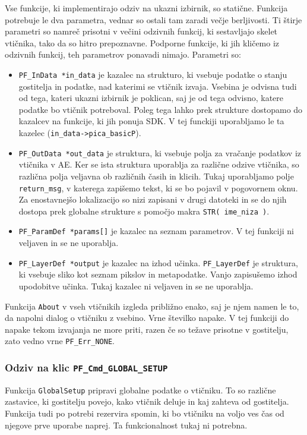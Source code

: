 \documentclass[a4paper, 12pt]{book}
\begin{document}
Vse funkcije, ki implementirajo odziv na ukazni izbirnik, so statične.
Funkcija potrebuje le dva parametra, vednar so ostali tam zaradi večje ber\-ljivosti\cite{aesdk}.	
Ti štirje parametri so namreč prisotni v večini odzivnih funkcij, ki sestavljajo skelet vtičnika, tako da so hitro prepoznavne. 
Podporne funkcije, ki jih kličemo iz odzivnih funkcij, teh parametrov ponavadi nimajo.
Parametri so:
\begin{itemize}
\item{\texttt{PF\_InData *in\_data} je kazalec na strukturo, ki vsebuje podatke o stanju gostitelja in podatke, nad katerimi se vtičnik izvaja. 
	Vsebina je odvisna tudi od tega, kateri ukazni izbirnik je poklican, saj je od tega odvisno, katere podatke bo vtičnik potreboval. 
	Poleg tega lahko prek strukture dostopamo do kazalcev na funkcije, ki jih ponuja SDK. 
	V tej funckiji uporabljamo le ta kazelec (\texttt{in\_data->pica\_basicP}). }
\item{\texttt{PF\_OutData *out\_data} je struktura, ki vsebuje polja za vračanje podatkov iz vtičnika v AE. 
	Ker se ista struktura uporablja za različne odzive vtičnika, so različna polja veljavna ob različnih časih in klicih. 
	Tukaj uporabljamo polje \texttt{return\_msg}, v katerega zapišemo tekst, ki se bo pojavil v pogovornem oknu. 
	Za enostavnejšo lokalizacijo so nizi zapisani v drugi datoteki in se do njih dostopa prek globalne strukture s pomočjo makra \texttt{STR( ime\_niza )}.  }
\item{\texttt{PF\_ParamDef *params[]} je kazalec na seznam parametrov. V tej funkciji ni veljaven in se ne uporablja.  }
\item{\texttt{PF\_LayerDef *output} je kazalec na izhod učinka. 
	\texttt{PF\_LayerDef} je struktura, ki vsebuje sliko kot seznam pikslov in metapodatke. 
	Vanjo zapisušemo izhod upodobitve učinka. Tukaj kazalec ni veljaven in se ne uporablja.  }
\end{itemize}

Funkcija \texttt{About} v vseh vtičnikih izgleda približno enako, saj je njem namen le to, da napolni dialog o vtičniku z vsebino.
Vrne številko napake.
V tej funkciji do napake tekom izvajanja ne more priti, razen če so težave prisotne v gostitelju, zato vedno vrne \texttt{PF\_Err\_NONE}.


\subsubsection{Odziv na klic \texttt{PF\_Cmd\_GLOBAL\_SETUP}}
Funkcija \texttt{GlobalSetup} pripravi globalne podatke o vtičniku. 
To so različne zastavice, ki gostitelju povejo, kako vtičnik deluje in kaj zahteva od gostitelja.
Funkcija tudi po potrebi rezervira spomin, ki bo vtičniku na voljo ves čas od njegove prve uporabe naprej.
Ta funkcionalnost tukaj ni potrebna.
\end{document}
